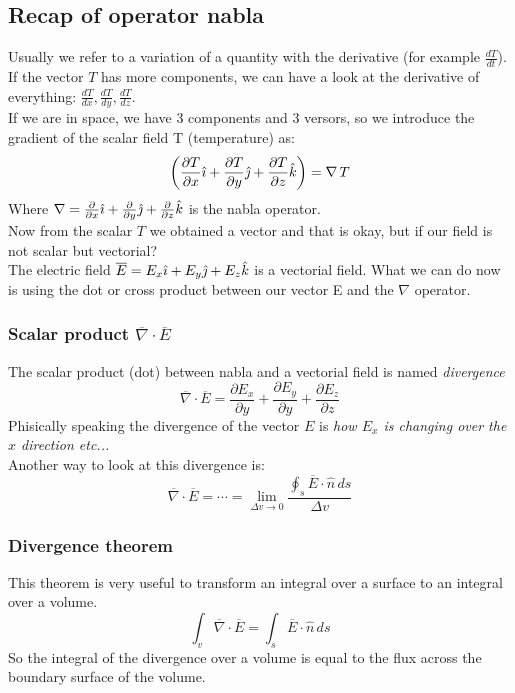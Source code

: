 \subsection*{Recap of operator nabla}
Usually we refer to a variation of a quantity with the derivative (for example $\frac{dT}{dt}$).\\
If the vector $T$ has more components, we can have a look at the derivative of everything: $\frac{dT}{dx},\frac{dT}{dy},\frac{dT}{dz}$.\\
If we are in space, we have 3 components and 3 versors, so we introduce the gradient of the scalar field T (temperature) as:
\begin{equation}
\left(\frac{\partial T}{\partial x}\hat{\imath}+\frac{\partial T}{\partial y}\hat{\jmath}+\frac{\partial T}{\partial z}\hat{\mathnormal{k}}\right)=\nabla\,T
\end{equation}
Where $\nabla=\frac{\partial}{\partial x}\hat{\imath} +\frac{\partial}{\partial y}\hat{\jmath} +\frac{\partial}{\partial z}\hat{\mathnormal{k}}$ is the nabla operator.\\
Now from the scalar $T$ we obtained a vector and that is okay, but if our field is not scalar but vectorial?\\
The electric field $\overline{E}=E_x \hat{\imath} + E_y \hat{\jmath} + E_z \hat{\mathnormal{k}}$ is a vectorial field.
What we can do now is using the dot or cross product between our vector E and the $\nabla$ operator.
\subsubsection*{Scalar product $\overline{\nabla} \cdot \overline{E}$}
The scalar product (dot) between nabla and a vectorial field is named \emph{divergence}
\begin{equation}
\overline{\nabla} \cdot \overline{E} =\frac{\partial E_x}{\partial y}+\frac{\partial E_y}{\partial y}+\frac{\partial E_z}{\partial z}
\end{equation}
Phisically speaking the divergence of the vector $E$ is \textit{how $E_x$ is changing over the $x$ direction etc...}\\
Another way to look at this divergence is:
\begin{equation}
\overline{\nabla} \cdot \overline{E} = \cdots = \lim_{\Delta v \rightarrow 0}\frac{\oint_s \overline{E}\cdot \hat{n}\, ds}{\Delta v}
\end{equation}
\subsubsection*{Divergence theorem}
This theorem is very useful to transform an integral over a surface to an integral over a volume.
\begin{equation}
\int_v \overline{\nabla} \cdot \overline{E} = \int_s \overline{E}\cdot \hat{n}\,ds
\end{equation}
So the integral of the divergence over a volume is equal to the flux across the boundary surface of the volume.
